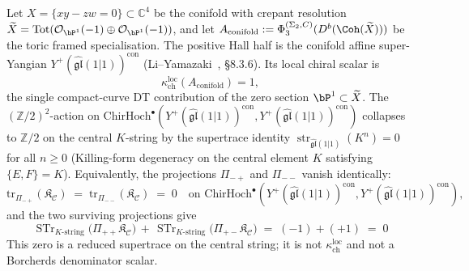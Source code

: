 \begin{theorem}
\label{thm:conifold-two-term}
Let $X = \{xy - zw = 0\} \subset \mathbb{C}^4$ be the conifold with
crepant resolution $\widetilde{X} = \mathrm{Tot}(\mathcal{O}_{\bP^1}(-1)
\oplus \mathcal{O}_{\bP^1}(-1))$, and let
$A_{\mathrm{conifold}} :=
\Phi_3^{(\Sigma_2,C)}(D^b(\Coh(\widetilde{X})))$ be the toric framed
specialisation.  The positive Hall half is the conifold affine
super-Yangian
$Y^+(\widehat{\mathfrak{gl}}(1|1))^{\mathrm{con}}$
\textup{(}Li--Yamazaki~\cite{LiYamazaki2020}, \S$8.3.6$\textup{)}.
Its local chiral scalar is
\[
 \kappa_{\mathrm{ch}}^{\mathrm{loc}}(A_{\mathrm{conifold}})=1,
\]
the single compact-curve DT contribution of the zero section
$\bP^1\subset\widetilde X$.  The $(\mathbb{Z}/2)^2$-action on
$\mathrm{ChirHoch}^\bullet(Y^+(\widehat{\mathfrak{gl}}(1|1))^{\mathrm{con}},
Y^+(\widehat{\mathfrak{gl}}(1|1))^{\mathrm{con}})$ collapses to
$\mathbb{Z}/2$ on the central $K$-string by the supertrace identity
$\operatorname{str}_{\widehat{\mathfrak{gl}}(1|1)}(K^n)=0$ for all
$n \geq 0$
\textup{(}Killing-form degeneracy on the central element $K$
satisfying $\{E, F\} = K$\textup{).} Equivalently, the projections
$\Pi_{-+}$ and $\Pi_{--}$ vanish identically:
\[
 \mathrm{tr}_{\Pi_{-+}}(\mathfrak{K}_{\mathcal{C}})
 \;=\; \mathrm{tr}_{\Pi_{--}}(\mathfrak{K}_{\mathcal{C}}) \;=\; 0
 \quad\text{on }
 \mathrm{ChirHoch}^\bullet(Y^+(\widehat{\mathfrak{gl}}(1|1))^{\mathrm{con}},
Y^+(\widehat{\mathfrak{gl}}(1|1))^{\mathrm{con}}),
\]
and the two surviving projections give
\[
 \boxed{\;
 \operatorname{STr}_{K\text{-}\mathrm{string}}
 \bigl(\Pi_{++}\mathfrak{K}_{\mathcal{C}}\bigr)
 \,+\, \operatorname{STr}_{K\text{-}\mathrm{string}}
 \bigl(\Pi_{+-}\mathfrak{K}_{\mathcal{C}}\bigr)
 \;=\; (-1) + (+1) \;=\; 0
 \;}
\]
This zero is a reduced supertrace on the central string; it is not
$\kappa_{\mathrm{ch}}^{\mathrm{loc}}$ and not a Borcherds denominator
scalar.
\end{theorem}

